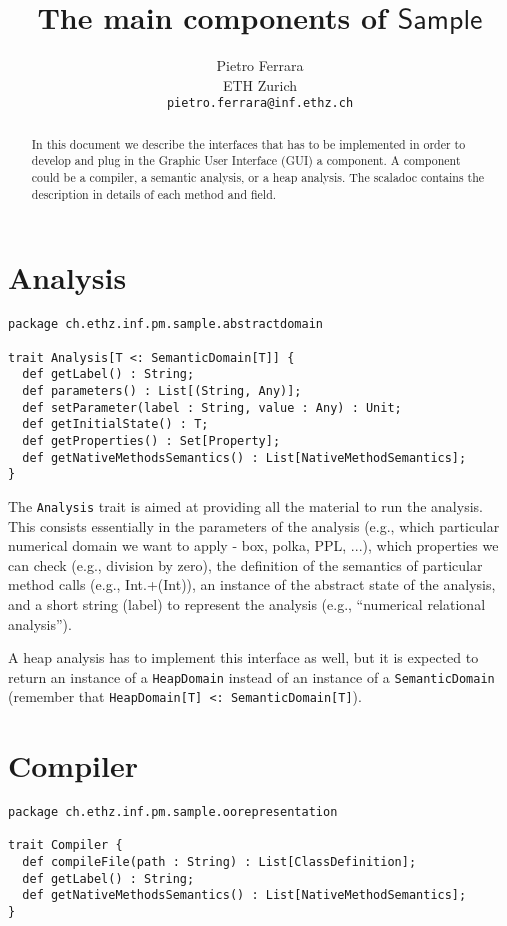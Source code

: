 \documentclass[11pt]{article}
\newcommand{\ScalaAnalyzer}{\ensuremath{\mathsf{Sample}}}
\newcommand{\statement}[1]{\lstinline{#1}}
\begin{document}
\title{The main components of \ScalaAnalyzer}

\author{
Pietro Ferrara\\
ETH Zurich\\
\texttt{pietro.ferrara@inf.ethz.ch}
}

\maketitle

\begin{abstract}
In this document we describe the interfaces that has to be implemented in order to develop and plug in the Graphic User Interface (GUI) a component. A component could be a compiler, a semantic analysis, or a heap analysis. The scaladoc contains the description in details of each method and field.
\end{abstract}


\section{Analysis}
\begin{lstlisting}
package ch.ethz.inf.pm.sample.abstractdomain

trait Analysis[T <: SemanticDomain[T]] {
  def getLabel() : String;
  def parameters() : List[(String, Any)];
  def setParameter(label : String, value : Any) : Unit;
  def getInitialState() : T;
  def getProperties() : Set[Property];
  def getNativeMethodsSemantics() : List[NativeMethodSemantics];
}
\end{lstlisting}

The \statement{Analysis} trait is aimed at providing all the material to run the analysis. This consists essentially in the parameters of the analysis (e.g., which particular numerical domain we want to apply - box, polka, PPL, ...), which properties we can check (e.g., division by zero), the definition of the semantics of particular method calls (e.g., Int.+(Int)), an instance of the abstract state of the analysis, and a short string (label) to represent the analysis (e.g., \textquotedblleft numerical relational analysis\textquotedblright).

A heap analysis has to implement this interface as well, but it is expected to return an instance of a \statement{HeapDomain} instead of an instance of a \statement{SemanticDomain} (remember that \statement{HeapDomain[T] <: SemanticDomain[T]}).

\section{Compiler}
\begin{lstlisting}
package ch.ethz.inf.pm.sample.oorepresentation

trait Compiler {
  def compileFile(path : String) : List[ClassDefinition];
  def getLabel() : String;
  def getNativeMethodsSemantics() : List[NativeMethodSemantics];
}
\end{lstlisting}
\end{document}
